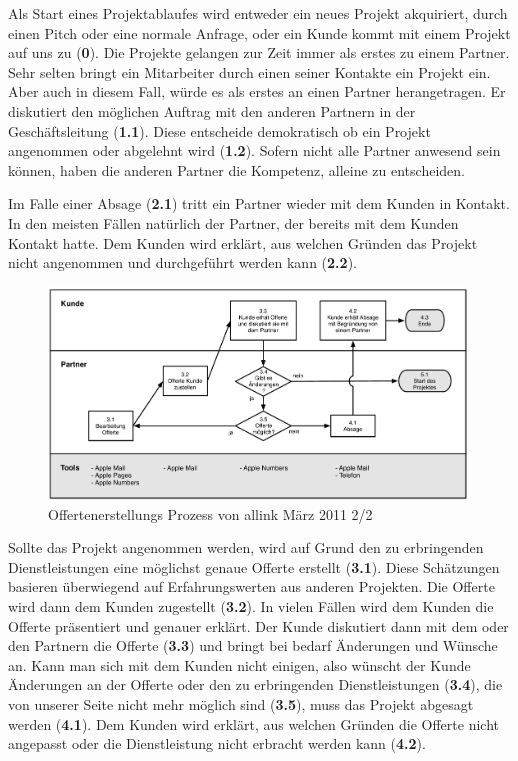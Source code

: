 Als Start eines Projektablaufes wird entweder ein neues Projekt akquiriert, 
durch einen Pitch oder eine normale Anfrage, oder ein Kunde kommt mit einem
Projekt auf uns zu (\textbf{0}).
Die Projekte gelangen zur Zeit immer als erstes zu einem Partner. Sehr selten
bringt ein Mitarbeiter durch einen seiner Kontakte ein Projekt ein. Aber auch in
diesem Fall, würde es als erstes an einen Partner herangetragen.
Er diskutiert den möglichen Auftrag mit den anderen Partnern in der Geschäftsleitung (\textbf{1.1}).
Diese entscheide demokratisch ob ein Projekt angenommen oder abgelehnt wird (\textbf{1.2}). 
Sofern nicht alle Partner anwesend sein können, haben die anderen Partner
die Kompetenz, alleine zu entscheiden.

Im Falle einer Absage (\textbf{2.1}) tritt ein Partner wieder mit dem Kunden in Kontakt.
In den meisten Fällen natürlich der Partner, der bereits mit dem Kunden Kontakt
hatte. Dem Kunden wird erklärt, aus welchen Gründen das Projekt nicht angenommen
und durchgeführt werden kann (\textbf{2.2}).

\begin{figure}[htbp]
\begin{center}
\includegraphics[width=0.99\textwidth,angle=0]{./bilder/01_ist_prozesse_offerte_02.pdf}
\caption{Offertenerstellungs Prozess von allink März 2011 2/2}
\label{pic:01_ist_prozesse_offerte_02}
\end{center}
\end{figure}

Sollte das Projekt angenommen werden, wird auf Grund den zu erbringenden
Dienstleistungen eine möglichst genaue Offerte erstellt (\textbf{3.1}). Diese Schätzungen
basieren überwiegend auf Erfahrungswerten aus anderen Projekten.
Die Offerte wird dann dem Kunden zugestellt (\textbf{3.2}). In vielen Fällen wird dem Kunden
die Offerte präsentiert und genauer erklärt.
Der Kunde diskutiert dann mit dem oder den Partnern die Offerte (\textbf{3.3}) und bringt
bei bedarf Änderungen und Wünsche an.
Kann man sich mit dem Kunden nicht einigen, also wünscht der Kunde Änderungen
an der Offerte oder den zu erbringenden Dienstleistungen (\textbf{3.4}), die von unserer Seite
nicht mehr möglich sind (\textbf{3.5}), muss das Projekt abgesagt werden (\textbf{4.1}).
Dem Kunden wird erklärt, aus welchen Gründen die Offerte nicht angepasst oder
die Dienstleistung nicht erbracht werden kann (\textbf{4.2}).

